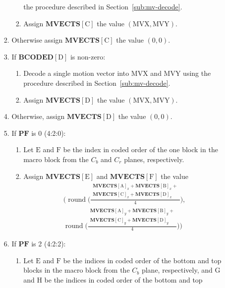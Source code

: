 \documentclass[9pt,letterpaper]{book}
\newcommand{\bitvar}[1]{\ensuremath{\mathbf{\bm{#1}}}}
\newcommand{\locvar}[1]{\ensuremath{\mathrm{#1}}}
\newcommand{\round}{\ensuremath{\mathop{\mathrm{round}}\nolimits}}
\numberwithin{equation}{chapter}
\numberwithin{figure}{chapter}
\numberwithin{table}{chapter}
\begin{document}
\begin{enumerate}
\begin{enumerate}
\begin{enumerate}
\begin{enumerate}
 the procedure described in Section~\ref{sub:mv-decode}.
\item Assign $\bitvar{MVECTS}[\locvar{C}]$ the value
 $(\locvar{MVX},\locvar{MVY})$.
\end{enumerate}
\item Otherwise assign $\bitvar{MVECTS}[\locvar{C}]$ the value $(0,0)$.
\item If $\bitvar{BCODED}[\locvar{D}]$ is non-zero:
\begin{enumerate}
\item Decode a single motion vector into \locvar{MVX} and \locvar{MVY} using
 the procedure described in Section~\ref{sub:mv-decode}.
\item Assign $\bitvar{MVECTS}[\locvar{D}]$ the value
 $(\locvar{MVX},\locvar{MVY})$.
\end{enumerate}
\item
Otherwise, assign $\bitvar{MVECTS}[\locvar{D}]$ the value $(0,0)$.
\item
If \bitvar{PF} is 0 (4:2:0):
\begin{enumerate}
\item
Let \locvar{E} and \locvar{F} be the index in coded order of the one block in
 the macro block from the $C_b$ and $C_r$ planes, respectively.
\item
Assign $\bitvar{MVECTS}[\locvar{E}]$ and $\bitvar{MVECTS}[\locvar{F}]$ the
 value
\begin{multline*}
(\round\biggl(\frac{\begin{aligned}
 \bitvar{MVECTS}[\locvar{A}]_x+\bitvar{MVECTS}[\locvar{B}]_x+\\
 \bitvar{MVECTS}[\locvar{C}]_x+\bitvar{MVECTS}[\locvar{D}]_x
 \end{aligned}}{4}\biggr), \\
 \round\biggl(\frac{\begin{aligned}
 \bitvar{MVECTS}[\locvar{A}]_y+\bitvar{MVECTS}[\locvar{B}]_y+\\
 \bitvar{MVECTS}[\locvar{C}]_y+\bitvar{MVECTS}[\locvar{D}]_y
 \end{aligned}}{4}\biggr))
\end{multline*}
\end{enumerate}
\item
If \bitvar{PF} is 2 (4:2:2):
\begin{enumerate}
\item
Let \locvar{E} and \locvar{F} be the indices in coded order of the bottom and
 top blocks in the macro block from the $C_b$ plane, respectively, and
 \locvar{G} and \locvar{H} be the indices in coded order of the bottom and top

\end{enumerate}
\end{enumerate}
\end{enumerate}
\end{enumerate}
\end{document}
